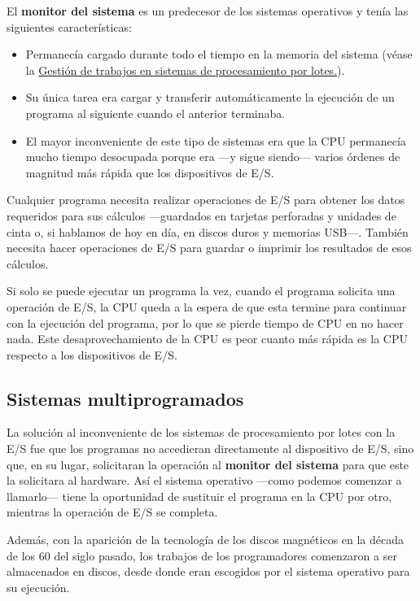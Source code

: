 El \textbf{{}monitor del sistema} es un predecesor de los sistemas
operativos y tenía las siguientes características:

\begin{itemize}
\item
  Permanecía cargado durante todo el tiempo en la memoria del sistema
  (véase la \hyperref[fig-sistemas-procesamiento-lotes]{Gestión de
  trabajos en sistemas de procesamiento por lotes.}).
\item
  Su única tarea era cargar y transferir automáticamente la ejecución de
  un programa al siguiente cuando el anterior terminaba.
\item
  El mayor inconveniente de este tipo de sistemas era que la CPU
  permanecía mucho tiempo desocupada porque era ---y sigue siendo---
  varios órdenes de magnitud más rápida que los dispositivos de E/S.
\end{itemize}

Cualquier programa necesita realizar operaciones de E/S para obtener los
datos requeridos para sus cálculos ---guardados en tarjetas perforadas y
unidades de cinta o, si hablamos de hoy en día, en discos duros y
memorias USB---. También necesita hacer operaciones de E/S para guardar
o imprimir los resultados de esos cálculos.

Si solo se puede ejecutar un programa la vez, cuando el programa
solicita una operación de E/S, la CPU queda a la espera de que esta
termine para continuar con la ejecución del programa, por lo que se
pierde tiempo de CPU en no hacer nada. Este desaprovechamiento de la CPU
es peor cuanto más rápida es la CPU respecto a los dispositivos de E/S.

\subsection{Sistemas multiprogramados}\label{_sistemas_multiprogramados}

{} La solución al inconveniente de los sistemas de procesamiento por
lotes con la E/S fue que los programas no accedieran directamente al
dispositivo de E/S, sino que, en su lugar, solicitaran la operación al
\textbf{monitor del sistema} para que este la solicitara al hardware.
Así el sistema operativo ---como podemos comenzar a llamarlo--- tiene la
oportunidad de sustituir el programa en la CPU por otro, mientras la
operación de E/S se completa.

Además, con la aparición de la tecnología de los discos magnéticos en la
década de los 60 del siglo pasado, los trabajos de los programadores
comenzaron a ser almacenados en discos, desde donde eran escogidos por
el sistema operativo para su ejecución.

